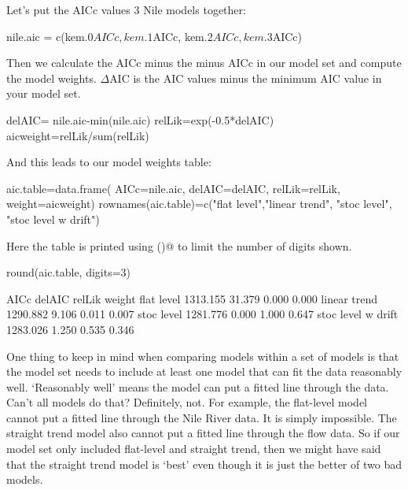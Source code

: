 Let's put the AICc values 3 Nile models together:
\begin{Schunk}
\begin{Sinput}
 nile.aic = c(kem.0$AICc, kem.1$AICc, kem.2$AICc, kem.3$AICc)
\end{Sinput}
\end{Schunk}
Then we calculate the AICc minus the minus AICc in our model set and compute the model weights.  $\Delta\text{AIC}$ is the AIC values minus the minimum AIC value in your model set.

\begin{Schunk}
\begin{Sinput}
 delAIC= nile.aic-min(nile.aic)
 relLik=exp(-0.5*delAIC)
 aicweight=relLik/sum(relLik)
\end{Sinput}
\end{Schunk}
And this leads to our model weights table:
\begin{Schunk}
\begin{Sinput}
 aic.table=data.frame(
 AICc=nile.aic, 
 delAIC=delAIC, 
 relLik=relLik, 
 weight=aicweight)
 rownames(aic.table)=c("flat level","linear trend", "stoc level", "stoc level w drift")
\end{Sinput}
\end{Schunk}
Here the table is printed using \verb@round()@ to limit the number of digits shown.
\begin{Schunk}
\begin{Sinput}
 round(aic.table, digits=3)
\end{Sinput}
\begin{Soutput}
                       AICc delAIC relLik weight
flat level         1313.155 31.379  0.000  0.000
linear trend       1290.882  9.106  0.011  0.007
stoc level         1281.776  0.000  1.000  0.647
stoc level w drift 1283.026  1.250  0.535  0.346
\end{Soutput}
\end{Schunk}

One thing to keep in mind when comparing models within a set of models is that the model set needs to include at least one model that can fit the data reasonably well.  `Reasonably well' means the model can put a fitted line through the data.  Can't all models do that?  Definitely, not.  For example, the flat-level model cannot put a fitted line through the Nile River data.  It is simply impossible.  The straight trend model also cannot put a fitted line through the flow data.  So if our model set only included flat-level and straight trend, then we might have said that the straight trend model is `best' even though it is just the better of two bad models.

